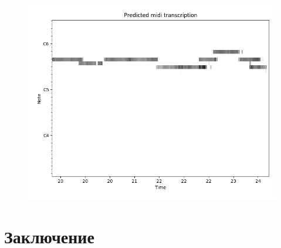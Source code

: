 \documentclass[unicode]{beamer}
\begin{document}
\begin{frame}
\begin{figure}
    \includegraphics[scale=.5]
      {res/daj-ci-boze-dobranoc-overfit-028-acoustic-zoomed-for-presentation.png}
\end{figure}
\end{frame}

\section{Заключение}

\begin{frame}
\end{frame}
\end{document}
